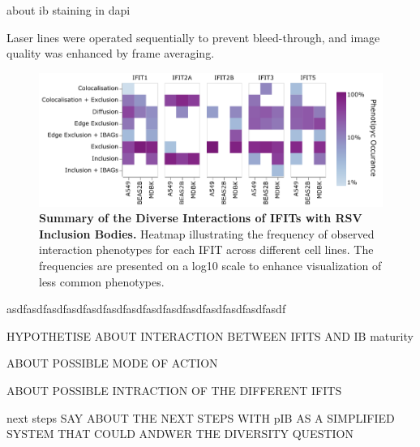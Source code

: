about ib staining in dapi

Laser lines were operated sequentially to prevent bleed-through, and image quality was enhanced by frame averaging.



\begin{figure}
    \centering
    \includegraphics[width=1\linewidth]{08. Chapter 3/Figs/heatmap_infection.pdf}
    \caption[Summary of the Diverse Interactions of IFITs with RSV Inclusion Bodies.]{\textbf{Summary of the Diverse Interactions of IFITs with RSV Inclusion Bodies.} Heatmap illustrating the frequency of observed interaction phenotypes for each IFIT across different cell lines. The frequencies are presented on a log10 scale to enhance visualization of less common phenotypes.}
    \label{fig:Summary of the Diverse Interactions of IFITs with RSV Inclusion Bodies}
\end{figure}

asdfasdfasdfasdfasdfasdfasdfasdfasdfasdfasdfasdfasdfasdf

HYPOTHETISE ABOUT INTERACTION BETWEEN IFITS AND IB maturity

ABOUT POSSIBLE MODE OF ACTION

ABOUT POSSIBLE INTRACTION OF THE DIFFERENT IFITS


next steps
SAY ABOUT THE NEXT STEPS WITH pIB AS A SIMPLIFIED SYSTEM THAT COULD ANDWER THE DIVERSITY QUESTION




